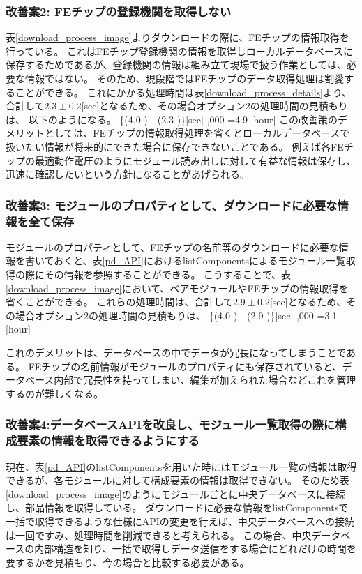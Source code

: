 \subsubsection{改善案2: FEチップの登録機関を取得しない}
表\ref{download_process_image}よりダウンロードの際に、FEチップの情報取得を行っている。
これはFEチップ登録機関の情報を取得しローカルデータベースに保存するためであるが、登録機関の情報は組み立て現場で扱う作業としては、必要な情報ではない。
そのため、現段階ではFEチップのデータ取得処理は割愛することができる。
これにかかる処理時間は表\ref{download_process_details}より、合計して$2.3\pm0.2$[sec]となるため、その場合オプション2の処理時間の見積もりは、
以下のようになる。
\bbb
\{(4.0 ) - (2.3 )\}[\rm{sec}] ,000 =4.9  [{\rm hour}]
\eee
この改善策のデメリットとしては、FEチップの情報取得処理を省くとローカルデータベースで扱いたい情報が将来的にできた場合に保存できないことである。
例えば各FEチップの最適動作電圧のようにモジュール読み出しに対して有益な情報は保存し、迅速に確認したいという方針になることがあげられる。

\subsubsection{改善案3: モジュールのプロパティとして、ダウンロードに必要な情報を全て保存}
モジュールのプロパティとして、FEチップの名前等のダウンロードに必要な情報を書いておくと、表\ref{pd_API}におけるlistComponentsによるモジュール一覧取得の際にその情報を参照することができる。
こうすることで、表\ref{download_process_image}において、ベアモジュールやFEチップの情報取得を省くことができる。
これらの処理時間は、合計して$2.9\pm0.2$[sec]となるため、その場合オプション2の処理時間の見積もりは、
\bbb
\{(4.0 ) - (2.9 )\}[\rm{sec}] ,000 =3.1  [{\rm hour}] 
\eee

これのデメリットは、データベースの中でデータが冗長になってしまうことである。
FEチップの名前情報がモジュールのプロパティにも保存されていると、データベース内部で冗長性を持ってしまい、編集が加えられた場合などこれを管理するのが難しくなる。

\subsubsection{改善案4:データベースAPIを改良し、モジュール一覧取得の際に構成要素の情報を取得できるようにする}
現在、表\ref{pd_API}のlistComponentsを用いた時にはモジュール一覧の情報は取得できるが、各モジュールに対して構成要素の情報は取得できない。
そのため表\ref{download_process_image}のようにモジュールごとに中央データベースに接続し、部品情報を取得している。
ダウンロードに必要な情報をlistComponentsで一括で取得できるような仕様にAPIの変更を行えば、中央データベースへの接続は一回ですみ、処理時間を削減できると考えられる。
この場合、中央データベースの内部構造を知り、一括で取得しデータ送信をする場合にどれだけの時間を要するかを見積もり、今の場合と比較する必要がある。\\


